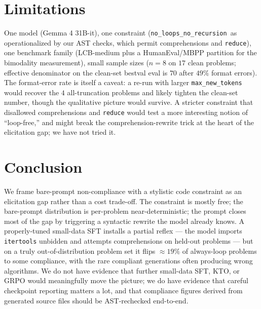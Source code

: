 \documentclass[11pt]{article}
\newcommand{\nlnr}{\texttt{no\_loops\_no\_recursion}}
\begin{document}
\section{Limitations}
\label{sec:limitations}

One model (Gemma 4 31B-it), one constraint (\nlnr\ as operationalized by our AST checks, which permit comprehensions and \texttt{reduce}), one benchmark family (LCB-medium plus a HumanEval/MBPP partition for the bimodality measurement), small sample sizes ($n=8$ on $17$ clean problems; effective denominator on the clean-set bestval eval is $70$ after $49\%$ format errors). The format-error rate is itself a caveat: a re-run with larger \texttt{max\_new\_tokens} would recover the $4$ all-truncation problems and likely tighten the clean-set number, though the qualitative picture would survive. A stricter constraint that disallowed comprehensions and \texttt{reduce} would test a more interesting notion of ``loop-free,'' and might break the comprehension-rewrite trick at the heart of the elicitation gap; we have not tried it.

\section{Conclusion}
\label{sec:conclusion}

We frame bare-prompt non-compliance with a stylistic code constraint as an elicitation gap rather than a cost trade-off. The constraint is mostly free; the bare-prompt distribution is per-problem near-deterministic; the prompt closes most of the gap by triggering a syntactic rewrite the model already knows. A properly-tuned small-data SFT installs a partial reflex --- the model imports \texttt{itertools} unbidden and attempts comprehensions on held-out problems --- but on a truly out-of-distribution problem set it flips $\approx 19\%$ of always-loop problems to some compliance, with the rare compliant generations often producing wrong algorithms. We do not have evidence that further small-data SFT, KTO, or GRPO would meaningfully move the picture; we do have evidence that careful checkpoint reporting matters a lot, and that compliance figures derived from generated source files should be AST-rechecked end-to-end.



\end{document}
